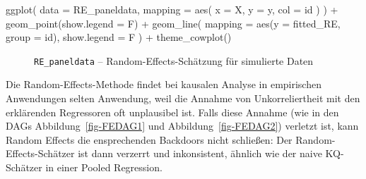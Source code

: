 \documentclass[
  a4paper,
  DIV=11,
  oneside]{scrreprt}
\newenvironment{Shaded}{\begin{snugshade}}{\end{snugshade}}
\newcommand{\AttributeTok}[1]{\textcolor[rgb]{0.40,0.45,0.13}{#1}}
\newcommand{\FunctionTok}[1]{\textcolor[rgb]{0.28,0.35,0.67}{#1}}
\newcommand{\NormalTok}[1]{\textcolor[rgb]{0.00,0.23,0.31}{#1}}
\newcommand{\SpecialCharTok}[1]{\textcolor[rgb]{0.37,0.37,0.37}{#1}}
\begin{document}
\begin{Shaded}
\begin{Highlighting}[]
\FunctionTok{ggplot}\NormalTok{(}
  \AttributeTok{data =}\NormalTok{ RE\_paneldata, }
  \AttributeTok{mapping =} 
    \FunctionTok{aes}\NormalTok{(}
      \AttributeTok{x =}\NormalTok{ X, }
      \AttributeTok{y =}\NormalTok{ y, }
      \AttributeTok{col =}\NormalTok{ id}
\NormalTok{    )}
\NormalTok{) }\SpecialCharTok{+} 
  \FunctionTok{geom\_point}\NormalTok{(}\AttributeTok{show.legend =}\NormalTok{ F) }\SpecialCharTok{+}
  \FunctionTok{geom\_line}\NormalTok{(}
    \AttributeTok{mapping =} \FunctionTok{aes}\NormalTok{(}\AttributeTok{y =}\NormalTok{ fitted\_RE, }\AttributeTok{group =}\NormalTok{ id), }
    \AttributeTok{show.legend =}\NormalTok{ F}
\NormalTok{  ) }\SpecialCharTok{+}
  \FunctionTok{theme\_cowplot}\NormalTok{()}
\end{Highlighting}
\end{Shaded}

\begin{figure}[t]


\caption{\label{fig-repanelest}\texttt{RE\_paneldata} --
Random-Effects-Schätzung für simulierte Daten}

\end{figure}%

Die Random-Effects-Methode findet bei kausalen Analyse in empirischen
Anwendungen selten Anwendung, weil die Annahme von Unkorreliertheit mit
den erklärenden Regressoren oft unplausibel ist. Falls diese Annahme
(wie in den DAGs Abbildung~\ref{fig-FEDAG1} und
Abbildung~\ref{fig-FEDAG2}) verletzt ist, kann Random Effects die
ensprechenden Backdoors nicht schließen: Der Random-Effects-Schätzer ist
dann verzerrt und inkonsistent, ähnlich wie der naive KQ-Schätzer in
einer Pooled Regression.
\end{document}

